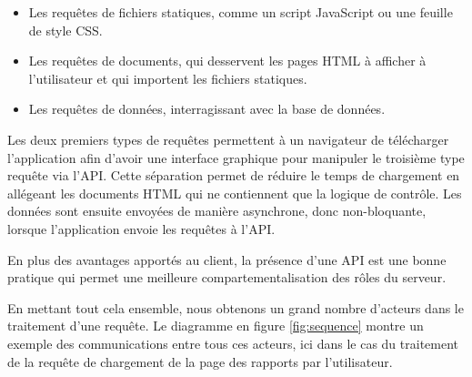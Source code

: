 \documentclass{EPL-master-thesis-covers-FR}
\begin{document}
				\begin{itemize}
					\item Les requêtes de fichiers statiques, comme un script JavaScript ou une feuille de style CSS.
					\item Les requêtes de documents, qui desservent les pages HTML à afficher à l'utilisateur et qui importent les fichiers statiques.
					\item Les requêtes de données, interragissant avec la base de données.
				\end{itemize}



				Les deux premiers types de requêtes permettent à un navigateur de télécharger l'application afin d'avoir une interface graphique pour manipuler le troisième type requête via l'API. Cette séparation permet de réduire le temps de chargement en allégeant les documents HTML qui ne contiennent que la logique de contrôle. Les données sont ensuite envoyées de manière asynchrone, donc non-bloquante, lorsque l'application envoie les requêtes à l'API.

				En plus des avantages apportés au client, la présence d'une API est une bonne pratique qui permet une meilleure compartementalisation des rôles du serveur.

				En mettant tout cela ensemble, nous obtenons un grand nombre d'acteurs dans le traitement d'une requête. Le diagramme en figure \ref{fig:sequence} montre un exemple des communications entre tous ces acteurs, ici dans le cas du traitement de la requête de chargement de la page des rapports par l'utilisateur.
\end{document}
